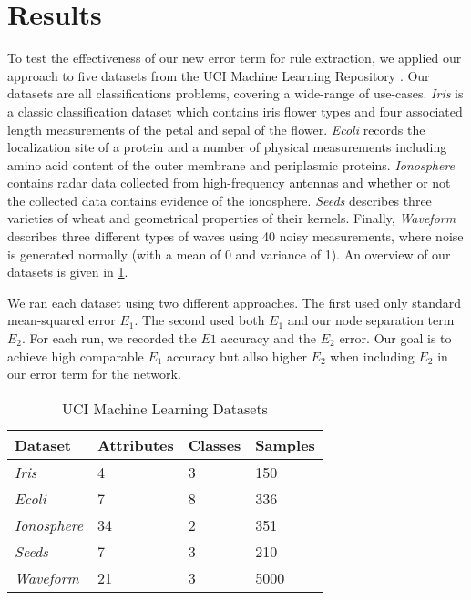 \section{Results}
\label{sec:results}

To test the effectiveness of our new error term for rule extraction,
we applied our approach to five 
datasets from the UCI Machine Learning Repository \cite{uci}. Our
datasets are all classifications problems, covering a wide-range of
use-cases. \textit{Iris} is a classic classification dataset which
contains iris flower types and four associated length
measurements of the petal and sepal of the flower. \textit{Ecoli}
records the localization site of a protein and a number of
physical measurements including amino acid content of the outer membrane
and periplasmic proteins. \textit{Ionosphere} contains radar data collected
from high-frequency antennas and whether or not the collected data
contains evidence of the ionosphere. \textit{Seeds} describes three
varieties of wheat and geometrical properties of their kernels.
Finally, \textit{Waveform} describes three different types of waves
using 40 noisy measurements, where noise is generated normally
(with a mean of 0 and variance of 1).
An overview of our datasets is given in \ref{tab:datasets}.

We ran each dataset using two different approaches. The first
used only standard mean-squared error $E_1$. The second used both
$E_1$ and our node separation term $E_2$. For each run, we recorded
the $E1$ accuracy and the $E_2$ error. Our goal is to achieve
high comparable $E_1$ accuracy but allso higher $E_2$ when including
$E_2$ in our error term for the network.

\begin{table}[]
  \centering
\begin{tabular}{@{}llll@{}}
\toprule
Dataset             & Attributes & Classes & Samples \\ \midrule
\textit{Iris}       & 4          & 3       & 150     \\
\textit{Ecoli}      & 7          & 8       & 336     \\
\textit{Ionosphere} & 34         & 2       & 351     \\
\textit{Seeds}      & 7          & 3       & 210     \\
\textit{Waveform}   & 21         & 3       & 5000    \\ \bottomrule
\end{tabular}
\caption{UCI Machine Learning Datasets}
\label{tab:datasets}
\end{table}

